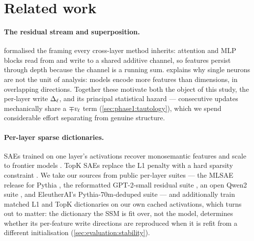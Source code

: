 \section{Related work}
\label{sec:related}

\paragraph{The residual stream and superposition.}
\citet{elhage2021mathematical} formalised the framing every cross-layer method
inherits: attention and MLP blocks read from and write to a shared additive
channel, so features persist through depth because the channel is a running
sum. \citet{elhage2022superposition} explains why single neurons are not the
unit of analysis: models encode more features than dimensions, in overlapping
directions. Together these motivate both the object of this study, the
per-layer write $\Delta_\ell$, and its principal statistical hazard --- consecutive
updates mechanically share a $\mp v_\ell$ term (\cref{sec:phase1:tautology}),
which we spend considerable effort separating from genuine structure.

\paragraph{Per-layer sparse dictionaries.}
SAEs trained on one layer's activations recover monosemantic features
\citep{cunningham2024sparse,bricken2023monosemanticity} and scale to frontier
models \citep{templeton2024scaling}. TopK SAEs replace the L1 penalty with a
hard sparsity constraint \citep{makhzani2013ksparse,gao2025scaling}. We take
our sources from public per-layer suites --- the MLSAE release for
Pythia \citep{lawson2025mlsae}, the reformatted GPT-2-small residual suite
\citep{bloom2024gpt2saes}, an open Qwen2 suite \citep{chanin2024qwensaes}, and
EleutherAI's Pythia-70m-deduped suite \citep{eleutherai2024sae} --- and
additionally
train matched L1 and TopK dictionaries on our own cached activations, which
turns out to matter: the dictionary the SSM is fit over, not the model,
determines whether its per-feature write directions are reproduced when it is
refit from a different initialisation (\cref{sec:evaluation:stability}).

